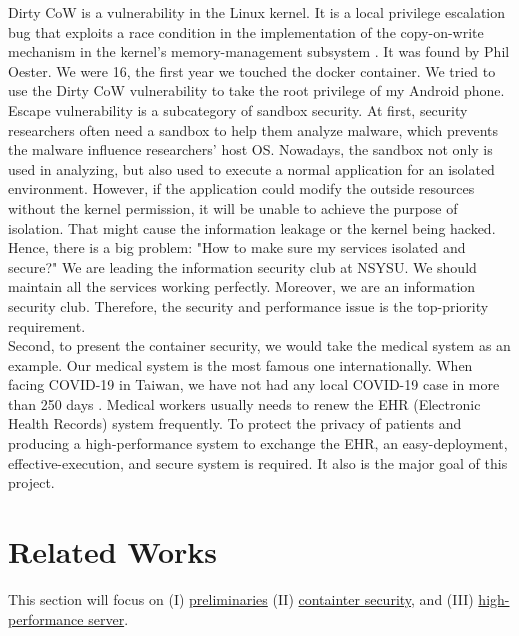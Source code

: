 \documentclass[12pt,a4paper]{article}
\begin{document}
Dirty CoW is a vulnerability in the Linux kernel. It is a local privilege escalation bug
that exploits a race condition in the implementation of the copy-on-write mechanism in the
kernel's memory-management subsystem \cite{Dirty_CoW_wiki}. It was found by Phil Oester. We
were 16, the first year we touched the docker container. We tried to use the Dirty CoW
vulnerability to take the root privilege of my Android phone.\\

Escape vulnerability is a subcategory of sandbox security. At first, security researchers often
need a sandbox to help them analyze malware, which prevents the malware influence researchers'
host OS. Nowadays, the sandbox not only is used in analyzing, but also used to execute a
normal application for an isolated environment. However, if the application could modify the
outside resources without the kernel permission, it will be unable to achieve the purpose of
isolation. That might cause the information leakage or the kernel being hacked.\\

Hence, there is a big problem: "How to make sure my services isolated and secure?"
We are leading the information security club at NSYSU. We should maintain all
the services working perfectly. Moreover, we are an information security club. Therefore,
the security and performance issue is the top-priority requirement.\\

Second, to present the container security, we would take the medical system as an example.
Our medical system is the most famous one internationally. When facing COVID-19
in Taiwan, we have not had any local COVID-19 case in more than 250 days \cite{COVID19_CNN}.
Medical workers usually needs to renew the EHR (Electronic Health Records)
system frequently. To protect the privacy of patients and producing a high-performance
system to exchange the EHR, an easy-deployment, effective-execution, and secure system is
required. It also is the major goal of this project.


\section{Related Works}
This section will focus on (\RN{1}) \hyperlink{preliminaries}{preliminaries} (\RN{2}) \hyperlink{security}{containter security}, and (\RN{3})
\hyperlink{heigh_performance}{high-performance server}.
\end{document}
